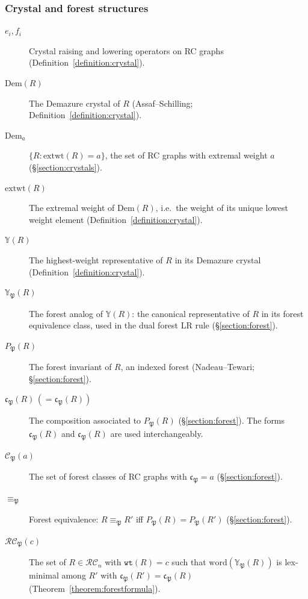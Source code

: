 \documentclass[a4paper,fleqn]{cas-sc}
\theoremstyle{definition}
\theoremstyle{remark}
\numberwithin{equation}{subsection}
\newcommand{\wtt}{\mathtt{wt}}
\newcommand{\RC}{\mathcal{RC}}
\newcommand{\code}{\mathfrak{c}}
\newcommand{\forest}{\mathfrak{P}}
\newcommand{\fcode}{\mathfrak{c}_\forest}
\newcommand{\finv}{P_{\forest}}
\begin{document}
\subsubsection*{Crystal and forest structures}
\begin{description}
\item[$e_i,f_i$] Crystal raising and lowering operators on RC graphs (Definition~\ref{definition:crystal}).
\item[$\mathrm{Dem}(R)$] The Demazure crystal of $R$ (Assaf--Schilling; Definition~\ref{definition:crystal}).
\item[$\mathrm{Dem}_a$] $\{R:\mathrm{extwt}(R)=a\}$, the set of RC graphs with extremal weight $a$ (\S\ref{section:crystals}).
\item[$\mathrm{extwt}(R)$] The extremal weight of $\mathrm{Dem}(R)$, i.e.\ the weight of its unique lowest weight element (Definition~\ref{definition:crystal}).
\item[$\mathbb{Y}(R)$] The highest-weight representative of $R$ in its Demazure crystal (Definition~\ref{definition:crystal}).
\item[$\mathbb{Y}_\forest(R)$] The forest analog of $\mathbb{Y}(R)$: the canonical representative of $R$ in its forest equivalence class, used in the dual forest LR rule (\S\ref{section:forest}).
\item[$\finv(R)$] The forest invariant of $R$, an indexed forest (Nadeau--Tewari; \S\ref{section:forest}).
\item[$\fcode(R)\,(=\code_\forest(R))$] The composition associated to $\finv(R)$ (\S\ref{section:forest}). The forms $\fcode(R)$ and $\code_\forest(R)$ are used interchangeably.
\item[$\mathcal{C}_\forest(a)$] The set of forest classes of RC graphs with $\fcode=a$ (\S\ref{section:forest}).
\item[$\equiv_\forest$] Forest equivalence: $R\equiv_\forest R'$ iff $\finv(R)=\finv(R')$ (\S\ref{section:forest}).
\item[$\RC_\forest(c)$] The set of $R\in\RC_n$ with $\wtt(R)=c$ such that $\mathrm{word}(\mathbb{Y}_\forest(R))$ is lex-minimal among $R'$ with $\code_\forest(R')=\code_\forest(R)$ (Theorem~\ref{theorem:forestformula}).
\end{description}
\end{document}
